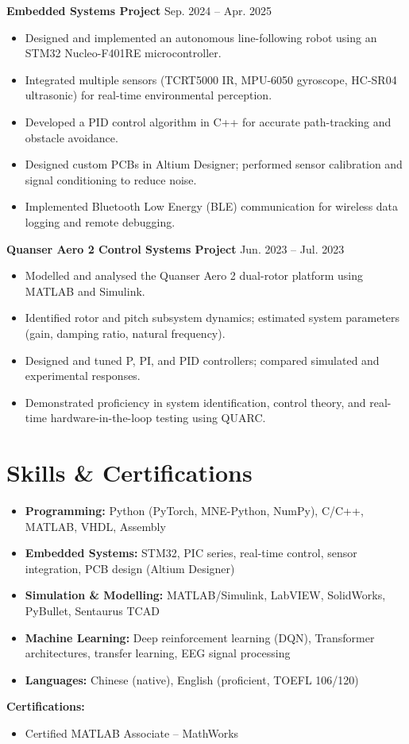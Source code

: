 \documentclass[11pt, a4paper]{article}
\newcommand{\entry}[2]{\textbf{#1} \hfill #2}
\begin{document}
\vspace{4pt}
\entry{Embedded Systems Project}{Sep. 2024 -- Apr. 2025}
\begin{itemize}[leftmargin=*, nosep, topsep=2pt]
    \item Designed and implemented an autonomous line-following robot using an STM32 Nucleo-F401RE microcontroller.
    \item Integrated multiple sensors (TCRT5000 IR, MPU-6050 gyroscope, HC-SR04 ultrasonic) for real-time environmental perception.
    \item Developed a PID control algorithm in C++ for accurate path-tracking and obstacle avoidance.
    \item Designed custom PCBs in Altium Designer; performed sensor calibration and signal conditioning to reduce noise.
    \item Implemented Bluetooth Low Energy (BLE) communication for wireless data logging and remote debugging.
\end{itemize}

\vspace{4pt}
\entry{Quanser Aero 2 Control Systems Project}{Jun. 2023 -- Jul. 2023}
\begin{itemize}[leftmargin=*, nosep, topsep=2pt]
    \item Modelled and analysed the Quanser Aero 2 dual-rotor platform using MATLAB and Simulink.
    \item Identified rotor and pitch subsystem dynamics; estimated system parameters (gain, damping ratio, natural frequency).
    \item Designed and tuned P, PI, and PID controllers; compared simulated and experimental responses.
    \item Demonstrated proficiency in system identification, control theory, and real-time hardware-in-the-loop testing using QUARC.
\end{itemize}

\section{Skills \& Certifications}
\begin{itemize}[leftmargin=*, nosep, topsep=2pt]
    \item \textbf{Programming:} Python (PyTorch, MNE-Python, NumPy), C/C++, MATLAB, VHDL, Assembly
    \item \textbf{Embedded Systems:} STM32, PIC series, real-time control, sensor integration, PCB design (Altium Designer)
    \item \textbf{Simulation \& Modelling:} MATLAB/Simulink, LabVIEW, SolidWorks, PyBullet, Sentaurus TCAD
    \item \textbf{Machine Learning:} Deep reinforcement learning (DQN), Transformer architectures, transfer learning, EEG signal processing
    \item \textbf{Languages:} Chinese (native), English (proficient, TOEFL 106/120)
\end{itemize}

\vspace{4pt}
\textbf{Certifications:}
\begin{itemize}[leftmargin=*, nosep, topsep=2pt]
    \item Certified MATLAB Associate -- MathWorks
\end{itemize}
\end{document}
